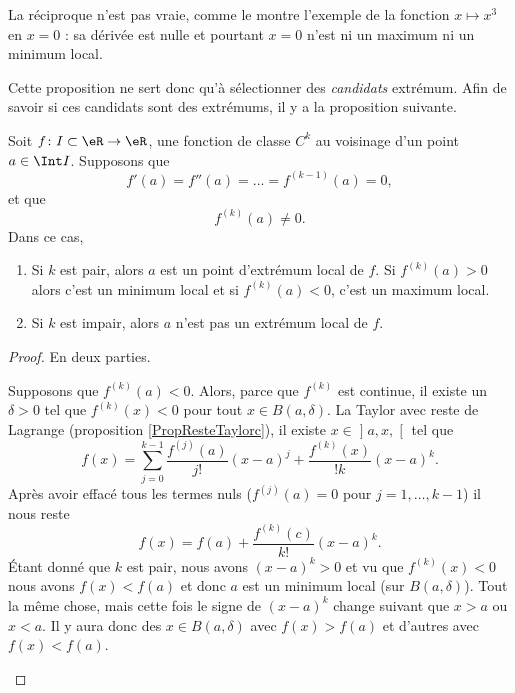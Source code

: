La réciproque n'est pas vraie, comme le montre l'exemple de la fonction \( x\mapsto x^3\) en \( x=0\) : sa dérivée est nulle et pourtant \( x=0\) n'est ni un maximum ni un minimum local.

Cette proposition ne sert donc qu'à sélectionner des \emph{candidats} extrémum. Afin de savoir si ces candidats sont des extrémums, il y a la proposition suivante.
\begin{proposition}     \label{PROPooCXHPooSlRsEJ}
	Soit \( f\colon I\subset \eR\to \eR\), une fonction de classe \( C^k\) au voisinage d'un point \( a\in\Int I\). Supposons que
	\begin{equation}
		f'(a)=f''(a)=\ldots=f^{(k-1)}(a)=0,
	\end{equation}
	et que
	\begin{equation}
		f^{(k)}(a)\neq 0.
	\end{equation}
	Dans ce cas,
	\begin{enumerate}
		\item		\label{ITEMooFJNAooCKGQVZ}
		      Si \( k\) est pair, alors \( a\) est un point d'extrémum local de \( f\). Si \( f^{(k)}(a)>0\) alors c'est un minimum local et si \( f^{(k)}(a)<0\), c'est un maximum local.
		\item		\label{ITEMooKNIOooOUXDJM}
		      Si \( k\) est impair, alors \( a\) n'est pas un extrémum local de \( f\).
	\end{enumerate}
\end{proposition}

\begin{proof}
	En deux parties.
	\begin{subproof}
		Supposons que \( f^{(k)}(a)<0\). Alors, parce que \( f^{(k)}\) est continue, il existe un \( \delta>0\) tel que \( f^{(k)}(x)<0\) pour tout \( x\in B(a,\delta)\). La Taylor avec reste de Lagrange (proposition \ref{PropResteTaylorc}), il existe \( x\in \mathopen] a,x,\mathclose[\) tel que
		\begin{equation}
			f(x)=\sum_{j=0}^{k-1}\frac{ f^{(j)}(a) }{ j! }(x-a)^j+\frac{ f^{(k)}(x) }{ !k }(x-a)^k.
		\end{equation}
		Après avoir effacé tous les termes nuls (\( f^{(j)}(a)=0\) pour \( j=1,\ldots,k-1\)) il nous reste
		\begin{equation}
			f(x)=f(a)+\frac{ f^{(k)}(c) }{ k! }(x-a)^k.
		\end{equation}
		Étant donné que \( k\) est pair, nous avons \( (x-a)^k>0\) et vu que \( f^{(k)}(x)<0\) nous avons \( f(x)<f(a)\) et donc \( a\) est un minimum local (sur \( B(a,\delta)\)).
		Tout la même chose, mais cette fois le signe de \( (x-a)^k\) change suivant que \( x>a\) ou \( x<a\). Il y aura donc des \( x\in B(a,\delta)\) avec \( f(x)>f(a) \) et d'autres avec \( f(x)<f(a)\).
	\end{subproof}
\end{proof}

